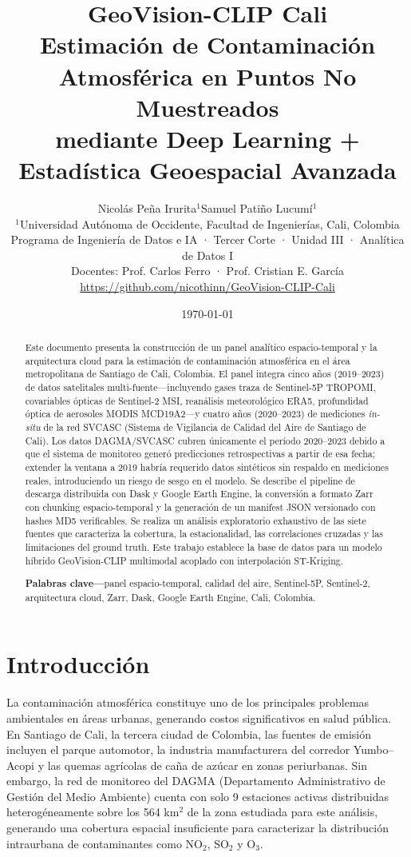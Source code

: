 \documentclass[10pt,a4paper,twocolumn]{article}
\title{\vspace{-0.7cm}\Large\bfseries GeoVision-CLIP Cali\\[0.15cm]
       \large Estimación de Contaminación Atmosférica en Puntos No Muestreados\\[0.05cm]
       \normalsize mediante Deep Learning + Estadística Geoespacial Avanzada}
\author{\small
  Nicolás Peña Irurita$^{1}$\hspace{0.3cm}Samuel Patiño Lucumí$^{1}$\\[0.1cm]
  \footnotesize $^{1}$Universidad Autónoma de Occidente, Facultad de Ingenierías, Cali, Colombia\\[0.1cm]
  \footnotesize Programa de Ingeniería de Datos e IA · Tercer Corte · Unidad III · Analítica de Datos I\\[0.05cm]
  \footnotesize Docentes: Prof. Carlos Ferro · Prof. Cristian E. García\\[0.05cm]
  \footnotesize \url{https://github.com/nicothinn/GeoVision-CLIP-Cali}
}
\date{\footnotesize \today}
\begin{document}
    \maketitle
    \begin{abstract}
    Este documento presenta la construcción de un panel analítico espacio-temporal y la arquitectura cloud para la estimación de contaminación atmosférica en el área metropolitana de Santiago de Cali, Colombia. El panel integra cinco años (2019--2023) de datos satelitales multi-fuente---incluyendo gases traza de Sentinel-5P TROPOMI, covariables ópticas de Sentinel-2 MSI, reanálisis meteorológico ERA5, profundidad óptica de aerosoles MODIS MCD19A2---y cuatro años (2020--2023) de mediciones \textit{in-situ} de la red SVCASC (Sistema de Vigilancia de Calidad del Aire de Santiago de Cali). Los datos DAGMA/SVCASC cubren únicamente el período 2020--2023 debido a que el sistema de monitoreo generó predicciones retrospectivas a partir de esa fecha; extender la ventana a 2019 habría requerido datos sintéticos sin respaldo en mediciones reales, introduciendo un riesgo de sesgo en el modelo. Se describe el pipeline de descarga distribuida con Dask y Google Earth Engine, la conversión a formato Zarr con chunking espacio-temporal y la generación de un manifest JSON versionado con hashes MD5 verificables. Se realiza un análisis exploratorio exhaustivo de las siete fuentes que caracteriza la cobertura, la estacionalidad, las correlaciones cruzadas y las limitaciones del ground truth. Este trabajo establece la base de datos para un modelo híbrido GeoVision-CLIP multimodal acoplado con interpolación ST-Kriging.

    \vspace{0.15cm}
    \noindent\textbf{Palabras clave---}panel espacio-temporal, calidad del aire, Sentinel-5P, Sentinel-2, arquitectura cloud, Zarr, Dask, Google Earth Engine, Cali, Colombia.
    \end{abstract}
    \vspace{0.55cm}

\section{Introducción}

La contaminación atmosférica constituye uno de los principales problemas ambientales en áreas urbanas, generando costos significativos en salud pública. En Santiago de Cali, la tercera ciudad de Colombia, las fuentes de emisión incluyen el parque automotor, la industria manufacturera del corredor Yumbo--Acopi y las quemas agrícolas de caña de azúcar en zonas periurbanas. Sin embargo, la red de monitoreo del DAGMA (Departamento Administrativo de Gestión del Medio Ambiente) cuenta con solo 9 estaciones activas distribuidas heterogéneamente sobre los 564 km$^2$ de la zona estudiada para este análisis, generando una cobertura espacial insuficiente para caracterizar la distribución intraurbana de contaminantes como NO$_2$, SO$_2$ y O$_3$.
\end{document}
